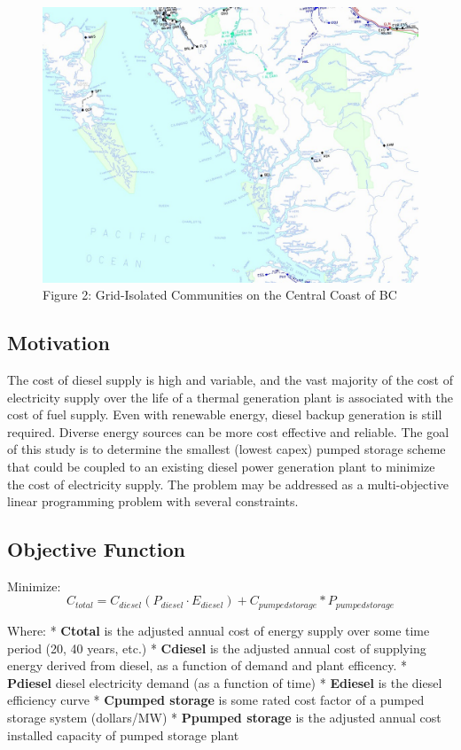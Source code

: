 \documentclass[11pt]{article}
\makeatletter
\def\maxwidth{\ifdim\Gin@nat@width>\linewidth\linewidth
    \else\Gin@nat@width\fi}
\let\Oldincludegraphics\includegraphics
\renewcommand{\includegraphics}[1]{\Oldincludegraphics[width=.8\maxwidth]{#1}}
\makeatother
\begin{document}
\begin{figure}
\centering
\includegraphics{images/remote_communities.jpg}
\caption{Figure 2: Grid-Isolated Communities on the Central Coast of BC}
\end{figure}

    \hypertarget{motivation}{%
\subsection{Motivation}\label{motivation}}

The cost of diesel supply is high and variable, and the vast majority of
the cost of electricity supply over the life of a thermal generation
plant is associated with the cost of fuel supply. Even with renewable
energy, diesel backup generation is still required. Diverse energy
sources can be more cost effective and reliable. The goal of this study
is to determine the smallest (lowest capex) pumped storage scheme that
could be coupled to an existing diesel power generation plant to
minimize the cost of electricity supply. The problem may be addressed as
a multi-objective linear programming problem with several constraints.

\hypertarget{objective-function}{%
\subsection{Objective Function}\label{objective-function}}

Minimize:
\[C_{total} = C_{diesel}(P_{diesel} \cdot E_{diesel}) + C_{pumped storage}*P_{pumped storage}\]

Where: * \textbf{Ctotal} is the adjusted annual cost of energy supply
over some time period (20, 40 years, etc.) * \textbf{Cdiesel} is the
adjusted annual cost of supplying energy derived from diesel, as a
function of demand and plant efficency. * \textbf{Pdiesel} diesel
electricity demand (as a function of time) * \textbf{Ediesel} is the
diesel efficiency curve * \textbf{Cpumped storage} is some rated cost
factor of a pumped storage system (dollars/MW) * \textbf{Ppumped
storage} is the adjusted annual cost installed capacity of pumped
storage plant
\end{document}
